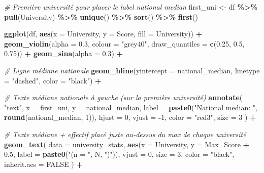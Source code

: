 \documentclass[
]{article}
\newenvironment{Shaded}{\begin{snugshade}}{\end{snugshade}}
\newcommand{\AttributeTok}[1]{\textcolor[rgb]{0.13,0.29,0.53}{#1}}
\newcommand{\CommentTok}[1]{\textcolor[rgb]{0.56,0.35,0.01}{\textit{#1}}}
\newcommand{\ConstantTok}[1]{\textcolor[rgb]{0.56,0.35,0.01}{#1}}
\newcommand{\DecValTok}[1]{\textcolor[rgb]{0.00,0.00,0.81}{#1}}
\newcommand{\FloatTok}[1]{\textcolor[rgb]{0.00,0.00,0.81}{#1}}
\newcommand{\FunctionTok}[1]{\textcolor[rgb]{0.13,0.29,0.53}{\textbf{#1}}}
\newcommand{\NormalTok}[1]{#1}
\newcommand{\OtherTok}[1]{\textcolor[rgb]{0.56,0.35,0.01}{#1}}
\newcommand{\SpecialCharTok}[1]{\textcolor[rgb]{0.81,0.36,0.00}{\textbf{#1}}}
\newcommand{\StringTok}[1]{\textcolor[rgb]{0.31,0.60,0.02}{#1}}
\begin{document}
\begin{Shaded}
\begin{Highlighting}[]
  \CommentTok{\# Première université pour placer le label national median}
\NormalTok{  first\_uni }\OtherTok{\textless{}{-}}\NormalTok{ df }\SpecialCharTok{\%\textgreater{}\%} \FunctionTok{pull}\NormalTok{(University) }\SpecialCharTok{\%\textgreater{}\%} \FunctionTok{unique}\NormalTok{() }\SpecialCharTok{\%\textgreater{}\%} \FunctionTok{sort}\NormalTok{() }\SpecialCharTok{\%\textgreater{}\%} \FunctionTok{first}\NormalTok{()}
  
  \FunctionTok{ggplot}\NormalTok{(df, }\FunctionTok{aes}\NormalTok{(}\AttributeTok{x =}\NormalTok{ University, }\AttributeTok{y =}\NormalTok{ Score, }\AttributeTok{fill =}\NormalTok{ University)) }\SpecialCharTok{+}
    \FunctionTok{geom\_violin}\NormalTok{(}\AttributeTok{alpha =} \FloatTok{0.3}\NormalTok{, }\AttributeTok{colour =} \StringTok{"grey40"}\NormalTok{, }\AttributeTok{draw\_quantiles =} \FunctionTok{c}\NormalTok{(}\FloatTok{0.25}\NormalTok{, }\FloatTok{0.5}\NormalTok{, }\FloatTok{0.75}\NormalTok{)) }\SpecialCharTok{+}
    \FunctionTok{geom\_sina}\NormalTok{(}\AttributeTok{alpha =} \FloatTok{0.3}\NormalTok{) }\SpecialCharTok{+}
    
    \CommentTok{\# Ligne médiane nationale}
    \FunctionTok{geom\_hline}\NormalTok{(}\AttributeTok{yintercept =}\NormalTok{ national\_median, }\AttributeTok{linetype =} \StringTok{"dashed"}\NormalTok{, }\AttributeTok{color =} \StringTok{"black"}\NormalTok{) }\SpecialCharTok{+}
    
    \CommentTok{\# Texte médiane nationale à gauche (sur la première université)}
    \FunctionTok{annotate}\NormalTok{(}
      \StringTok{"text"}\NormalTok{,}
      \AttributeTok{x =}\NormalTok{ first\_uni,}
      \AttributeTok{y =}\NormalTok{ national\_median,}
      \AttributeTok{label =} \FunctionTok{paste0}\NormalTok{(}\StringTok{"National median: "}\NormalTok{, }\FunctionTok{round}\NormalTok{(national\_median, }\DecValTok{1}\NormalTok{)),}
      \AttributeTok{hjust =} \DecValTok{0}\NormalTok{, }\AttributeTok{vjust =} \SpecialCharTok{{-}}\DecValTok{1}\NormalTok{, }\AttributeTok{color =} \StringTok{"red3"}\NormalTok{, }\AttributeTok{size =} \DecValTok{3}
\NormalTok{    ) }\SpecialCharTok{+}
    
    \CommentTok{\# Texte médiane + effectif placé juste au{-}dessus du max de chaque université}
    \FunctionTok{geom\_text}\NormalTok{(}
      \AttributeTok{data =}\NormalTok{ university\_stats, }
      \FunctionTok{aes}\NormalTok{(}\AttributeTok{x =}\NormalTok{ University, }\AttributeTok{y =}\NormalTok{ Max\_Score }\SpecialCharTok{+} \FloatTok{0.5}\NormalTok{, }\AttributeTok{label =} \FunctionTok{paste0}\NormalTok{(}\StringTok{"(n = "}\NormalTok{, N, }\StringTok{")"}\NormalTok{)),}
      \AttributeTok{vjust =} \DecValTok{0}\NormalTok{, }\AttributeTok{size =} \DecValTok{3}\NormalTok{, }\AttributeTok{color =} \StringTok{"black"}\NormalTok{, }\AttributeTok{inherit.aes =} \ConstantTok{FALSE}
\NormalTok{    ) }\SpecialCharTok{+}
    

\end{Highlighting}
\end{Shaded}
\end{document}
